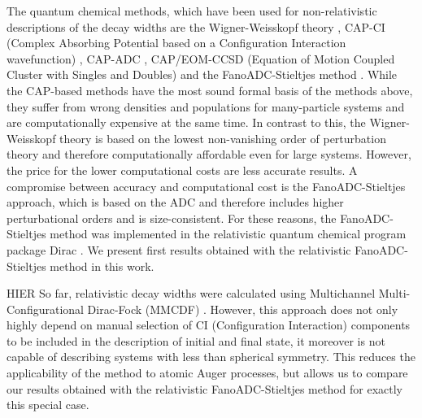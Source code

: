 The quantum chemical methods, which have been used for non-relativistic       
descriptions of the decay widths are the Wigner-Weisskopf       
theory \cite{Santra02}, CAP-CI                                  
(Complex Absorbing Potential based on a Configuration Interaction wavefunction)
\cite{SakuraiModern94,Santra01_3}, CAP-ADC \cite{Vaval07},      
CAP/EOM-CCSD (Equation of Motion Coupled Cluster with Singles and Doubles)    
\cite{Ghosh14} and the FanoADC-Stieltjes method                 
\cite{Averbukh05}.                                              
While the CAP-based methods have the most sound formal basis    
of the methods above, they suffer from wrong densities and populations for    
many-particle systems                                           
and are computationally expensive at the same time.             
In contrast to this, the                                        
Wigner-Weisskopf theory is based on the lowest                  
non-vanishing order of perturbation                             
theory and therefore computationally affordable even for large systems.       
However, the price for the lower                                
computational costs are less accurate results. A compromise between
accuracy and computational cost is the FanoADC-Stieltjes approach, which      
is based on the {ADC} and therefore includes                    
higher perturbational orders and is size-consistent.            
For these reasons,                                              
the FanoADC-Stieltjes method was implemented in the relativistic
quantum chemical program package Dirac \cite{DIRAC13}. We present first results
obtained with the relativistic FanoADC-Stieltjes method in this work.

HIER
So far, relativistic decay widths were calculated using         
Multichannel Multi-Configurational Dirac-Fock (MMCDF) \cite{Fritzsche11}.     
However, this approach                                          
does not only highly depend on manual selection of CI (Configuration
Interaction) components to be included in the description of initial and      
final state, it moreover is not capable of describing systems with less       
than spherical symmetry. This reduces the applicability of the method to      
atomic Auger processes, but allows us to compare our results obtained with    
the relativistic FanoADC-Stieltjes method for exactly this special case.

